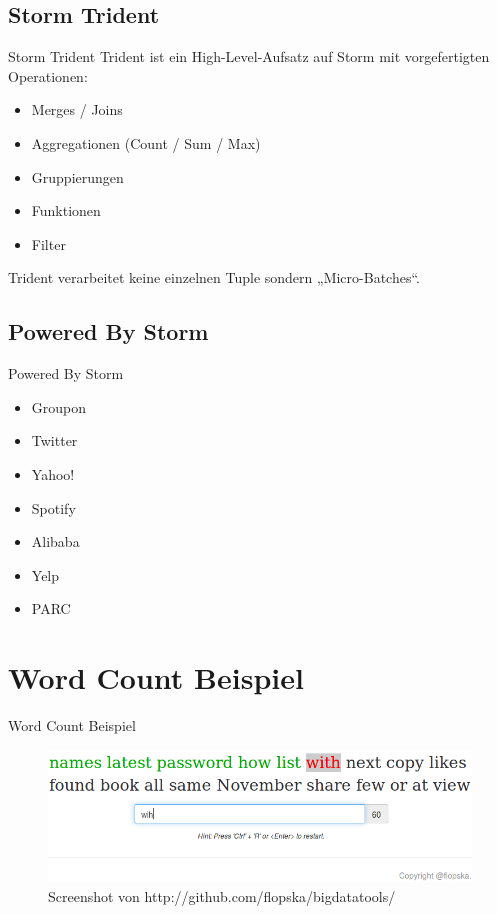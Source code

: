 \documentclass{beamer}
\begin{document}
\subsection{Storm Trident}
\begin{frame}[t]{Storm Trident}
  Trident ist ein High-Level-Aufsatz auf Storm mit vorgefertigten Operationen:
  \begin{itemize}
    \item Merges / Joins
    \item Aggregationen (Count / Sum / Max)
    \item Gruppierungen
    \item Funktionen
    \item Filter
  \end{itemize}
  Trident verarbeitet keine einzelnen Tuple sondern „Micro-Batches“.
\end{frame}

\subsection{Powered By Storm}
\begin{frame}[t]{Powered By Storm}
  \begin{itemize}
    \item Groupon
    \item Twitter
    \item Yahoo!
    \item Spotify
    \item Alibaba
    \item Yelp
    \item PARC
  \end{itemize}
\end{frame}

\section{Word Count Beispiel}
\begin{frame}[t]{Word Count Beispiel}
  \begin{figure}
    \centering
    \includegraphics[scale=0.3,natwidth=750,natheight=234]{img/webapp.png}
    \caption{Screenshot von http://github.com/flopska/bigdatatools/}
  \end{figure}
\end{frame}
\end{document}
